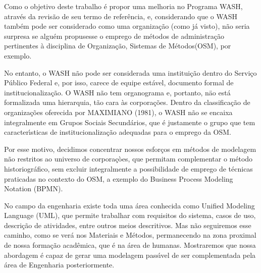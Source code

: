 \documentclass[
12pt,		%
openright,	%
twoside,  %
a4paper,			%
chapter=TITLE,		%
english,			%
french,				%
spanish,			%
brazil				%
]{USPSC-classe/USPSC}
\begin{document}
Como o objetivo deste trabalho \'e propor uma melhoria no Programa WASH, atrav\'es da revis\~ao de seu termo de refer\^encia, e, considerando que o WASH tamb\'em pode ser considerado como uma organiza\c{c}\~ao (como j\'a visto), n\~ao seria surpresa se algu\'em propusesse o emprego de m\'etodos de administra\c{c}\~ao pertinentes \`a disciplina de \textquotedbl Organiza\c{c}\~ao, Sistemas de M\'etodos\textquotedbl  (OSM), por exemplo.










\noindent\begin{center}\mbox{\centering{}}\end{center}


No entanto, o WASH n\~ao pode ser considerada uma institui\c{c}\~ao  dentro do Servi\c{c}o P\'ublico Federal e, por isso, carece de equipe est\'avel, documento formal de institucionaliza\c{c}\~ao. O WASH n\~ao tem organograma e, portanto, näo est\'a formalizada uma hierarquia, t\~ao cara \`as corpora\c{c}\~oes. Dentro da classifica\c{c}\~ao de organiza\c{c}\~oes oferecida por  MAXIMIANO (1981), o WASH n\~ao se encaixa integralmente em \textquotedbl Grupos Sociais Secund\'arios\textquotedbl , que \'e justamente o grupo que tem caracter\'{\i}sticas de institucionaliza\c{c}\~ao adequadas para o emprego da OSM.









Por esse motivo, decidimos concentrar nossos esfor\c{c}os  em m\'etodos de modelagem n\~ao restritos ao universo de corpora\c{c}òes, que permitam complementar o m\'etodo historiogr\'afico, sem excluir integralmente a possibilidade de emprego de t\'ecnicas praticadas no contexto do OSM, a exemplo do Business Process Modeling Notation (BPMN).









No campo da engenharia existe toda uma \'area conhecida como Unified Modeling Language (UML), que permite trabalhar com requisitos do sistema, casos de uso, descri\c{c}\~ao de atividades, entre outros meios descritivos. Mas n\~ao seguiremos esse caminho, como se ver\'a nos Materiais e M\'etodos, permanecendo na zona proximal de nossa forma\c{c}\~ao acad\^emica, que \'e na \'area de humanas. Mostraremos que nossa abordagem \'e capaz de gerar uma modelagem pass\'{\i}vel de ser complementada pela \'area de Engenharia posteriormente.
\end{document}
